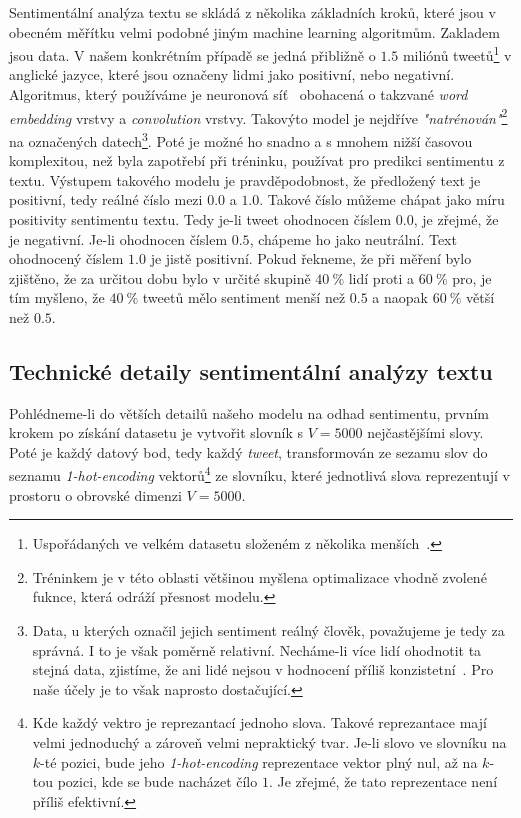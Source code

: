\documentclass[12pt, a4paper]{article}
\numberwithin{equation}{section} 	%
\begin{document}
Sentimentální analýza textu se skládá z několika základních kroků, které jsou v obecném měřítku velmi podobné jiným machine learning algoritmům. Zakladem jsou data. V našem konkrétním případě se jedná přibližně o $1.5$ miliónů tweetů\footnote{Uspořádaných ve velkém datasetu složeném z několika menších~\cite{TwitterData1, TwitterData2}.} v anglické jazyce, které jsou označeny lidmi jako positivní, nebo negativní. Algoritmus, který používáme je neuronová síť~\cite{TwitterSentAnalysis} obohacená o takzvané \textit{word embedding} vrstvy a \textit{convolution} vrstvy. Takovýto model je nejdříve \textit{"natrénován"}\footnote{Tréninkem je v této oblasti většinou myšlena optimalizace vhodně zvolené fuknce, která odráží přesnost modelu.} na označených datech\footnote{Data, u kterých označil jejich sentiment reálný člověk, považujeme je tedy za správná. I to je však poměrně relativní. Necháme-li více lidí ohodnotit ta stejná data, zjistíme, že ani lidé nejsou v hodnocení příliš konzistetní~\cite{HumanVsMachineLearning}. Pro naše účely je to však naprosto dostačující.}. Poté je možné ho snadno a s mnohem nižší časovou komplexitou, než byla zapotřebí při tréninku, používat pro predikci sentimentu z textu. Výstupem takového modelu je pravděpodobnost, že předložený text je positivní, tedy reálné číslo mezi $0.0$ a $1.0$. Takové číslo můžeme chápat jako míru positivity sentimentu textu. Tedy je-li tweet ohodnocen číslem $0.0$, je zřejmé, že je negativní. Je-li ohodnocen číslem $0.5$, chápeme ho jako neutrální. Text ohodnocený číslem $1.0$ je jistě positivní. Pokud řekneme, že při měření bylo zjištěno, že za určitou dobu bylo v určité skupině $40\ \%$ lidí proti a $60\ \%$ pro, je tím myšleno, že $40\ \%$ tweetů mělo sentiment menší než $0.5$ a naopak $60\ \%$ větší než $0.5$.

\subsection{Technické detaily sentimentální analýzy textu}
\noindent Pohlédneme-li do větších detailů našeho modelu na odhad sentimentu, prvním krokem po získání datasetu je vytvořit slovník s $V = 5000$ nejčastějšími slovy. Poté je každý datový bod, tedy každý \textit{tweet}, transformován ze sezamu slov do seznamu \textit{1-hot-encoding} vektorů\footnote{Kde každý vektro je reprezantací jednoho slova. Takové reprezantace mají velmi jednoduchý a zároveň velmi nepraktický tvar. Je-li slovo ve slovníku na $k$-té pozici, bude jeho \textit{1-hot-encoding} reprezentace vektor plný nul, až na $k$-tou pozici, kde se bude nacházet čílo $1$. Je zřejmé, že tato reprezentace není příliš efektivní.} ze slovníku, které jednotlivá slova reprezentují v prostoru o obrovské dimenzi $V = 5000$.
\end{document}
